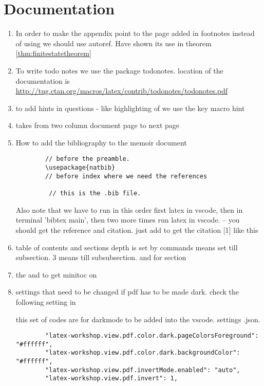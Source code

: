 \chapter[Documentation]{Documentation}

\begin{enumerate}
    \item In order to make the appendix point to the page added in footnotes instead of using \tcboxverb{\hyperref} we should use autoref. Have shown its use in theorem \autoref{thm:finitestatetheorem}
    \item To write todo notes we use the package todonotes. location of the documentation is \url{http://tug.ctan.org/macros/latex/contrib/todonotes/todonotes.pdf}
    \item to add hints in questions - like highlighting of  we use the key macro hint 
    \item \tcboxverb{\clearpage} takes from two column document page to next page 
    \item How to add the bibliography to the memoir document {\tiny  \begin{lstlisting}
        // before the preamble. 
        \usepackage{natbib}
        // before index where we need the references 
        
         // this is the .bib file. 
    \end{lstlisting}}
    Also note that we have to run in this order first latex in vscode, then in terminal 'bibtex main', then two more times run latex in vscode. -- you should get the reference and citation. just add \tcboxverb{\cite{}} to get the citation [1] like this 
    \item table of contents and sections depth is set by commands \tcboxverb{\setcounter{tocdepth}{1}} means set till subsection. $3$ means till subsubsection. and for section \tcboxverb{\setcounter{secnumdepth}{2}}
    \item the \tcboxverb{\usepackage{etoc}} and \tcboxverb{\localtableofcontents} to get minitoc on 
    \item settings that need to be changed if pdf has to be made dark. check the following setting in    
    
    \tcboxverb{//} this set of codes are for darkmode to be added into the vscode. settings .json.
    \begin{verbatim}
        "latex-workshop.view.pdf.color.dark.pageColorsForeground": "#ffffff",
        "latex-workshop.view.pdf.color.dark.backgroundColor": "#ffffff",
        "latex-workshop.view.pdf.invertMode.enabled": "auto",
        "latex-workshop.view.pdf.invert": 1,    
    \end{verbatim}
    
\end{enumerate}